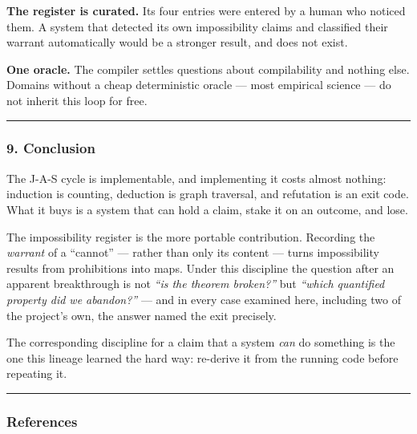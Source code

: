 \documentclass[
  11pt,
  a4paper,
]{article}
\begin{document}
\textbf{The register is curated.} Its four entries were entered by a
human who noticed them. A system that detected its own impossibility
claims and classified their warrant automatically would be a stronger
result, and does not exist.

\textbf{One oracle.} The compiler settles questions about compilability
and nothing else. Domains without a cheap deterministic oracle --- most
empirical science --- do not inherit this loop for free.

\begin{center}\rule{0.5\linewidth}{0.5pt}\end{center}

\subsubsection{9. Conclusion}\label{conclusion}

The J-A-S cycle is implementable, and implementing it costs almost
nothing: induction is counting, deduction is graph traversal, and
refutation is an exit code. What it buys is a system that can hold a
claim, stake it on an outcome, and lose.

The impossibility register is the more portable contribution. Recording
the \emph{warrant} of a ``cannot'' --- rather than only its content ---
turns impossibility results from prohibitions into maps. Under this
discipline the question after an apparent breakthrough is not \emph{``is
the theorem broken?''} but \emph{``which quantified property did we
abandon?''} --- and in every case examined here, including two of the
project's own, the answer named the exit precisely.

The corresponding discipline for a claim that a system \emph{can} do
something is the one this lineage learned the hard way: re-derive it
from the running code before repeating it.

\begin{center}\rule{0.5\linewidth}{0.5pt}\end{center}

\subsubsection{References}\label{references}
\end{document}
